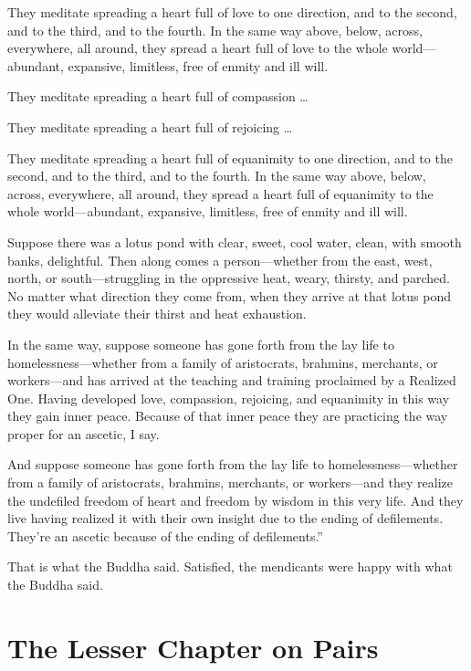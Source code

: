 \documentclass[12pt,openany]{book}%
\let\oldcontentsline\contentsline
\newcommand{\nopagecontentsline}[3]{\oldcontentsline{#1}{#2}{}}
\newcommand*{\tocchapterline}[1]{\bfseries\itshape{#1}}
\begin{document}
They meditate spreading a heart full of love to one direction, and to the second, and to the third, and to the fourth. In the same way above, below, across, everywhere, all around, they spread a heart full of love to the whole world—abundant, expansive, limitless, free of enmity and ill will. 

They meditate spreading a heart full of compassion … 

They meditate spreading a heart full of rejoicing … 

They meditate spreading a heart full of equanimity to one direction, and to the second, and to the third, and to the fourth. In the same way above, below, across, everywhere, all around, they spread a heart full of equanimity to the whole world—abundant, expansive, limitless, free of enmity and ill will. 

Suppose there was a lotus pond with clear, sweet, cool water, clean, with smooth banks, delightful. Then along comes a person—whether from the east, west, north, or south—struggling in the oppressive heat, weary, thirsty, and parched. No matter what direction they come from, when they arrive at that lotus pond they would alleviate their thirst and heat exhaustion. 

In the same way, suppose someone has gone forth from the lay life to homelessness—whether from a family of aristocrats, brahmins, merchants, or workers—and has arrived at the teaching and training proclaimed by a Realized One. Having developed love, compassion, rejoicing, and equanimity in this way they gain inner peace. Because of that inner peace they are practicing the way proper for an ascetic, I say. 

And suppose someone has gone forth from the lay life to homelessness—whether from a family of aristocrats, brahmins, merchants, or workers—and they realize the undefiled freedom of heart and freedom by wisdom in this very life. And they live having realized it with their own insight due to the ending of defilements. They’re an ascetic because of the ending of defilements.” 

That is what the Buddha said. Satisfied, the mendicants were happy with what the Buddha said. 

%
\chapter*{The Lesser Chapter on Pairs }
\addcontentsline{toc}{chapter}{\tocchapterline{The Lesser Chapter on Pairs }}
\addtocontents{toc}{\let\protect\contentsline\protect\oldcontentsline}
\end{document}
